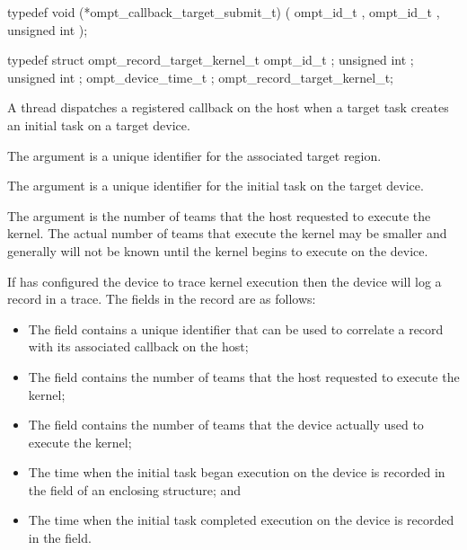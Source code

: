\format
\begin{ccppspecific}
\begin{omptCallback}
typedef void (*ompt_callback_target_submit_t) (
  ompt_id_t ,
  ompt_id_t ,
  unsigned int 
);
\end{omptCallback}
\end{ccppspecific}

\record
\begin{ccppspecific}
\begin{omptRecord}
typedef struct ompt_record_target_kernel_t {
  ompt_id_t ;
  unsigned int ;
  unsigned int ;
  ompt_device_time_t ;
} ompt_record_target_kernel_t;
\end{omptRecord}
\end{ccppspecific}

\descr
A thread dispatches a registered  callback 
on the host when a target task creates an initial task on a target device.

\argdesc
The  argument is a unique identifier for the associated 
target region.

The  argument is a unique identifier for the initial task 
on the target device.

The  argument is the number of teams that the host 
requested to execute the kernel. The actual number of teams that execute the 
kernel may be smaller and generally will not be known until the kernel begins 
to execute on the device.

If  has configured the device to trace kernel execution
then the device will log a  record in a trace. 
The fields in the record are as follows:

\begin{itemize}
\item The  field contains a unique identifier that can be used 
      to correlate a  record with its associated 
       callback on the host;
\item The  field contains the number of teams that the 
      host requested to execute the kernel;
\item The  field contains the number of teams that the 
      device actually used to execute the kernel;
\item The time when the initial task began execution on the device is recorded 
      in the  field of an enclosing  structure; and
\item The time when the initial task completed execution on the device is recorded 
      in the  field.
\end{itemize}

